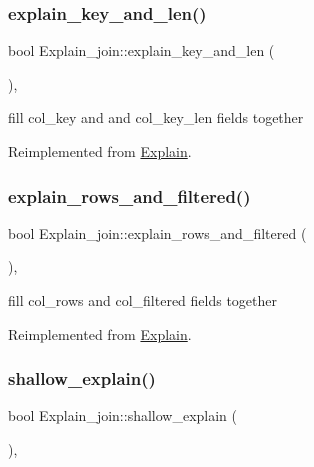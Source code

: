 \subsubsection{\texorpdfstring{explain\+\_\+key\+\_\+and\+\_\+len()}{explain\_key\_and\_len()}}
{\footnotesize\ttfamily bool Explain\+\_\+join\+::explain\+\_\+key\+\_\+and\+\_\+len (\begin{DoxyParamCaption}{ }\end{DoxyParamCaption})\hspace{0.3cm}{\ttfamily [protected]}, {\ttfamily [virtual]}}

fill col\+\_\+key and and col\+\_\+key\+\_\+len fields together 

Reimplemented from \mbox{\hyperlink{classExplain_a2a0e775012360ec5f276373e535e2059}{Explain}}.

\mbox{\label{classExplain__join_a407564ac2ce390da3f0edd30eb3b4a06}} 
\subsubsection{\texorpdfstring{explain\+\_\+rows\+\_\+and\+\_\+filtered()}{explain\_rows\_and\_filtered()}}
{\footnotesize\ttfamily bool Explain\+\_\+join\+::explain\+\_\+rows\+\_\+and\+\_\+filtered (\begin{DoxyParamCaption}{ }\end{DoxyParamCaption})\hspace{0.3cm}{\ttfamily [protected]}, {\ttfamily [virtual]}}

fill col\+\_\+rows and col\+\_\+filtered fields together 

Reimplemented from \mbox{\hyperlink{classExplain_a1c2766929ff005124f8f14ce33e15f34}{Explain}}.

\mbox{\label{classExplain__join_aa8ce397a394026c9065ffbfb0d624d75}} 
\subsubsection{\texorpdfstring{shallow\+\_\+explain()}{shallow\_explain()}}
{\footnotesize\ttfamily bool Explain\+\_\+join\+::shallow\+\_\+explain (\begin{DoxyParamCaption}{ }\end{DoxyParamCaption})\hspace{0.3cm}{\ttfamily [protected]}, {\ttfamily [virtual]}}

